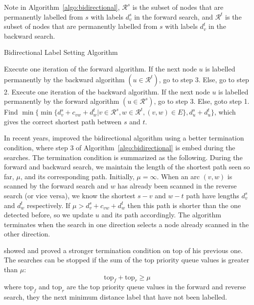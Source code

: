 Note in Algorithm~\ref{algo:bidirectional},
$\mathcal{R}^s$ is the subset of nodes that are permanently labelled from $s$ with labels $d_v^s$ in the forward search, and 
$\mathcal{R}^t$ is the subset of nodes that are permanently labelled from $s$ with labels $d_v^t$ in the backward search.

\begin{algorithm}[H]
    \caption{Bidirectional Label Setting Algorithm }
    \label{algo:bidirectional}
    \begin{algorithmic}[1]
        \State Execute one iteration of the forward algorithm.
        If the next node $u$ is labelled permanently by the 
        backward algorithm $(u\in\mathcal{R}^t)$, go to step 3.
        Else, go to step 2.
        \State Execute one iteration of the backward algorithm.
        If the next node $u$ is labelled permanently by the
        forward algorithm $(u\in\mathcal{R}^s)$, go to step 3.
        Else, goto step 1.
        \State Find $\min\{\min\{d_v^s + c_{vw} + d_w^t | v \in \mathcal{R}^s, w \in \mathcal{R}^t, (v, w) \in E\}, d_u^s + d_u^t\}$, which gives the correct shortest path between $s$ and $t$.
    \EndProcedure
\end{algorithmic}
\end{algorithm}

In recent years,
\citet{Goldberg05} improved the bidirectional algorithm using a better termination condition,
where step 3 of Algorithm~\ref{algo:bidirectional} is embed during the searches.
The termination condition is summarized as the following.
During the forward and backward search,
we maintain the length of the shortest path seen so far, $\mu$, and its corresponding path. Initially, $\mu = \infty$.
When an arc $(v,w)$ is scanned by the forward search and $w$ has already been scanned in the reverse search (or vice versa),
we know the shortest $s-v$ and $w-t$ path have lengths $d_v^s$ and $d_w^t$ respectively.
If $\mu > d_v^s + c_{vw} + d_w^t$ then this path is shorter than the one detected before, 
so we update $u$ and its path accordingly.
The algorithm terminates when the search in one direction selects a node already scanned in the other direction.

\citet{GoldbergEPP} showed and proved a stronger termination condition on top of his previous one.
The searches can be stopped if the sum of the top priority queue values is greater than $\mu$:
\[
    \text{top}_f + \text{top}_r \geq \mu
\]
where $\text{top}_f$ and $\text{top}_r$ are the top priority queue values in the forward and reverse search, they the next minimum distance label that have not been labelled.

